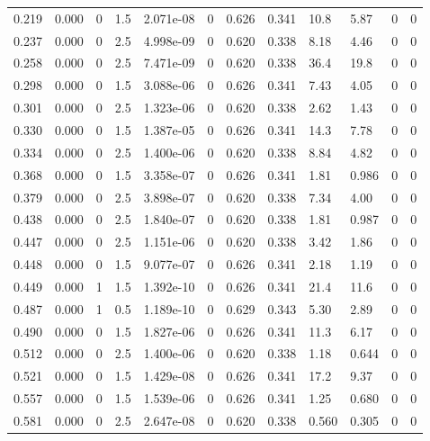 \documentclass[preview]{standalone}
\begin{document}
{{\begin{tabular}{L{1.2cm}C{1.2cm} C{0.3cm}C{0.5cm} C{1.4cm}C{1.4cm} C{1.4cm}C{1.4cm} C{1.6cm}C{1.6cm} C{1.6cm}C{1.6cm}}
  0.219  &  0.000  & 0     & 1.5 &  2.071e-08  & 0  &  0.626&   0.341& 10.8 & 5.87   &  0 & 0  \\ 
  0.237  &  0.000  & 0     & 2.5 &  4.998e-09  & 0  &  0.620&   0.338& 8.18 & 4.46   &  0 & 0  \\ 
  0.258  &  0.000  & 0     & 2.5 &  7.471e-09  & 0  &  0.620&   0.338& 36.4 & 19.8   &  0 & 0  \\ 
  0.298  &  0.000  & 0     & 1.5 &  3.088e-06  & 0  &  0.626&   0.341& 7.43 & 4.05   &  0 & 0  \\ 
  0.301  &  0.000  & 0     & 2.5 &  1.323e-06  & 0  &  0.620&   0.338& 2.62 & 1.43   &  0 & 0  \\ 
  0.330  &  0.000  & 0     & 1.5 &  1.387e-05  & 0  &  0.626&   0.341& 14.3 & 7.78   &  0 & 0  \\ 
  0.334  &  0.000  & 0     & 2.5 &  1.400e-06  & 0  &  0.620&   0.338& 8.84 & 4.82   &  0 & 0  \\ 
  0.368  &  0.000  & 0     & 1.5 &  3.358e-07  & 0  &  0.626&   0.341& 1.81 & 0.986   &  0 & 0  \\ 
  0.379  &  0.000  & 0     & 2.5 &  3.898e-07  & 0  &  0.620&   0.338& 7.34 & 4.00   &  0 & 0  \\ 
  0.438  &  0.000  & 0     & 2.5 &  1.840e-07  & 0  &  0.620&   0.338& 1.81 & 0.987   &  0 & 0  \\ 
  0.447  &  0.000  & 0     & 2.5 &  1.151e-06  & 0  &  0.620&   0.338& 3.42 & 1.86   &  0 & 0  \\ 
  0.448  &  0.000  & 0     & 1.5 &  9.077e-07  & 0  &  0.626&   0.341& 2.18 & 1.19   &  0 & 0  \\ 
  0.449  &  0.000  & 1     & 1.5 &  1.392e-10  & 0  &  0.626&   0.341& 21.4 & 11.6   &  0 & 0  \\ 
  0.487  &  0.000  & 1     & 0.5 &  1.189e-10  & 0  &  0.629&   0.343& 5.30 & 2.89   &  0 & 0  \\ 
  0.490  &  0.000  & 0     & 1.5 &  1.827e-06  & 0  &  0.626&   0.341& 11.3 & 6.17   &  0 & 0  \\ 
  0.512  &  0.000  & 0     & 2.5 &  1.400e-06  & 0  &  0.620&   0.338& 1.18 & 0.644   &  0 & 0  \\ 
  0.521  &  0.000  & 0     & 1.5 &  1.429e-08  & 0  &  0.626&   0.341& 17.2 & 9.37   &  0 & 0  \\ 
  0.557  &  0.000  & 0     & 1.5 &  1.539e-06  & 0  &  0.626&   0.341& 1.25 & 0.680   &  0 & 0  \\ 
  0.581  &  0.000  & 0     & 2.5 &  2.647e-08  & 0  &  0.620&   0.338& 0.560 & 0.305   &  0 & 0  \\ 

\end{tabular}}}
\end{document}
